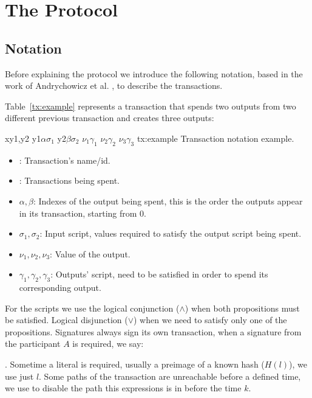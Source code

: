 \section{The Protocol}
\subsection{Notation}
Before explaining the protocol we introduce the following notation, based
  in the work of Andrychowicz et al. \cite{andrychowicz2014secure}, to describe
  the transactions.

Table~\ref{tx:example} represents a transaction that spends two outputs from
  two different previous transaction and creates three outputs:

  \transaction
    {x}{y1,y2}
      {y1}{$\alpha$}{$\sigma_1$}
      {y2}{$\beta$}{$\sigma_2$}
      \stopinputs
      {$\nu_1$}{$\gamma_1$}
      {$\nu_2$}{$\gamma_2$}
      {$\nu_3$}{$\gamma_3$}
      \stopoutputs
      {tx:example}
      {Transaction notation example.}

\begin{itemize}
    \item {}: Transaction's name/id.
    \item {}: Transactions being spent.
    \item $\alpha,\beta$: Indexes of the output being spent, this is the order
                            the outputs appear in its transaction, starting from
                            0.
    \item $\sigma_1,\sigma_2$: Input script, values required to satisfy the
                                output script being spent.
    \item $\nu_1,\nu_2,\nu_3$: Value of the output.
    \item $\gamma_1, \gamma_2, \gamma_3$: Outputs' script, need to be satisfied
                                          in order to spend its corresponding
                                          output.
\end{itemize}

For the scripts we use the logical conjunction ($\wedge$) when both propositions
  must be satisfied.
Logical disjunction ($\vee$) when we need to satisfy only one of the
  propositions.
Signatures always sign its own transaction, when a signature from the
  participant $A$ is required, we say: \signature{A}.
Sometime a literal is required, usually a preimage of a known hash ($H(l)$), we
  use just $l$. Some paths of the transaction are unreachable before a defined
  time, we use  to disable the path this expressions is in before the
  time $k$.

